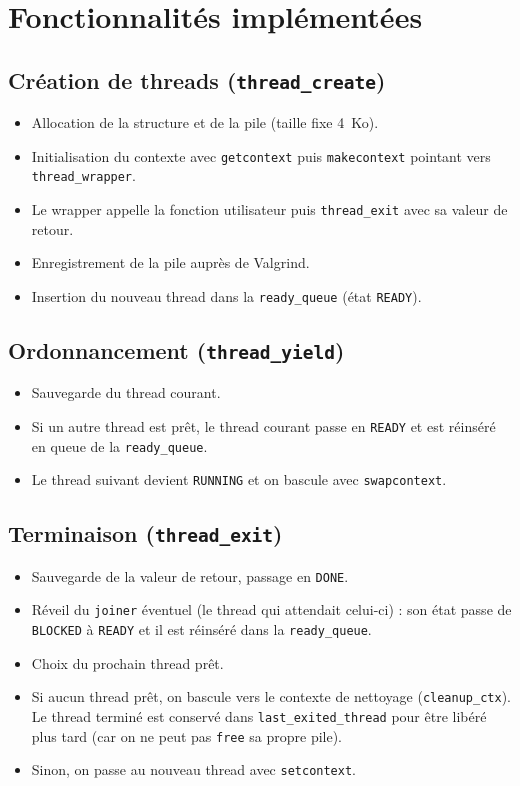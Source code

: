 \documentclass[12pt,a4paper]{article}
\begin{document}
\section{Fonctionnalités implémentées}

\subsection{Création de threads (\texttt{thread\_create})}

\begin{itemize}
    \item Allocation de la structure et de la pile (taille fixe 4~Ko).
    \item Initialisation du contexte avec \texttt{getcontext} puis \texttt{makecontext} pointant vers \texttt{thread\_wrapper}.
    \item Le wrapper appelle la fonction utilisateur puis \texttt{thread\_exit} avec sa valeur de retour.
    \item Enregistrement de la pile auprès de Valgrind.
    \item Insertion du nouveau thread dans la \texttt{ready\_queue} (état \texttt{READY}).
\end{itemize}

\subsection{Ordonnancement (\texttt{thread\_yield})}

\begin{itemize}
    \item Sauvegarde du thread courant.
    \item Si un autre thread est prêt, le thread courant passe en \texttt{READY} et est réinséré en queue de la \texttt{ready\_queue}.
    \item Le thread suivant devient \texttt{RUNNING} et on bascule avec \texttt{swapcontext}.
\end{itemize}

\subsection{Terminaison (\texttt{thread\_exit})}

\begin{itemize}
    \item Sauvegarde de la valeur de retour, passage en \texttt{DONE}.
    \item Réveil du \texttt{joiner} éventuel (le thread qui attendait celui-ci) : son état passe de \texttt{BLOCKED} à \texttt{READY} et il est réinséré dans la \texttt{ready\_queue}.
    \item Choix du prochain thread prêt.
    \item Si aucun thread prêt, on bascule vers le contexte de nettoyage (\texttt{cleanup\_ctx}). Le thread terminé est conservé dans \texttt{last\_exited\_thread} pour être libéré plus tard (car on ne peut pas \texttt{free} sa propre pile).
    \item Sinon, on passe au nouveau thread avec \texttt{setcontext}.
\end{itemize}
\end{document}
